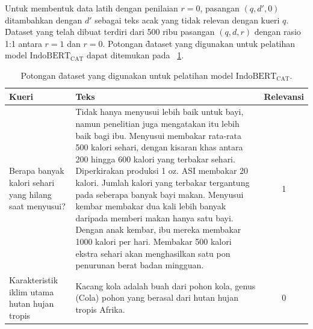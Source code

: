 Untuk membentuk data latih dengan penilaian $r=0$, pasangan $(q, d',0)$ ditambahkan dengan $d'$ sebagai teks acak yang tidak relevan dengan kueri $q$. \f{Dataset} yang telah dibuat terdiri dari 500 ribu pasangan $(q, d, r)$ dengan rasio 1:1 antara $r=1$ dan $r=0$. Potongan \f{dataset} yang digunakan untuk pelatihan model $\text{IndoBERT}_{\text{CAT}}$ dapat ditemukan pada \tab~\ref{tab:contoh-indobert-cat-data}.
\begin{table}
    \centering
    \caption{Potongan \f{dataset} yang digunakan untuk pelatihan model $\text{IndoBERT}_{\text{CAT}}$.}
    \label{tab:contoh-indobert-cat-data}
    \begin{tabular}{|p{2cm}|p{7cm}|c|} \hline
        \textbf{Kueri}                                         & \textbf{Teks}                                                                                                                                                                                                                                                                                                                                                                                                                                                                                                                                                                                          & \textbf{Relevansi} \\ \hline
        Berapa banyak kalori sehari yang hilang saat menyusui? & Tidak hanya menyusui lebih baik untuk bayi, namun penelitian juga mengatakan itu lebih baik bagi ibu. Menyusui membakar rata-rata 500 kalori sehari, dengan kisaran khas antara 200 hingga 600 kalori yang terbakar sehari. Diperkirakan produksi 1 oz. ASI membakar 20 kalori. Jumlah kalori yang terbakar tergantung pada seberapa banyak bayi makan. Menyusui kembar membakar dua kali lebih banyak daripada memberi makan hanya satu bayi. Dengan anak kembar, ibu mereka membakar 1000 kalori per hari. Membakar 500 kalori ekstra sehari akan menghasilkan satu pon penurunan berat badan mingguan. & 1                  \\ \hline
        Karakteristik iklim utama hutan hujan tropis           & Kacang kola adalah buah dari pohon kola, genus (Cola) pohon yang berasal dari hutan hujan tropis Afrika.                                                                                                                                                                                                                                                                                                                                                                                                                                                                                                  & 0                  \\ \hline

\end{tabular}
\end{table}

